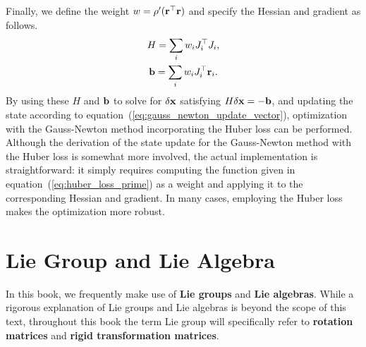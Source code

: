 Finally, we define the weight $w = \rho^{\prime}({\bf r}^{\top} {\bf r})$ and specify the Hessian and gradient as follows.
%
\begin{align}
  \begin{gathered}
    H = \sum_{i} w_{i} J_{i}^{\top} J_{i}, \\
    {\bf b} = \sum_{i} w_{i} J_{i}^{\top} {\bf r}_{i}.
  \end{gathered}
  \label{eq:hessian_and_gradient_gauss_newton_huber_loss_weight}
\end{align}
%
By using these $H$ and ${\bf b}$ to solve for $\delta {\bf x}$ satisfying $H \delta {\bf x} = -{\bf b}$, and updating the state according to equation~(\ref{eq:gauss_newton_update_vector}), optimization with the Gauss-Newton method incorporating the Huber loss can be performed.
Although the derivation of the state update for the Gauss-Newton method with the Huber loss is somewhat more involved, the actual implementation is straightforward: it simply requires computing the function given in equation~(\ref{eq:huber_loss_prime}) as a weight and applying it to the corresponding Hessian and gradient.
In many cases, employing the Huber loss makes the optimization more robust.
















\section{Lie Group and Lie Algebra}

In this book, we frequently make use of {\bf Lie groups} and {\bf Lie algebras}.
While a rigorous explanation of Lie groups and Lie algebras is beyond the scope of this text, throughout this book the term Lie group will specifically refer to {\bf rotation matrices} and {\bf rigid transformation matrices}.

